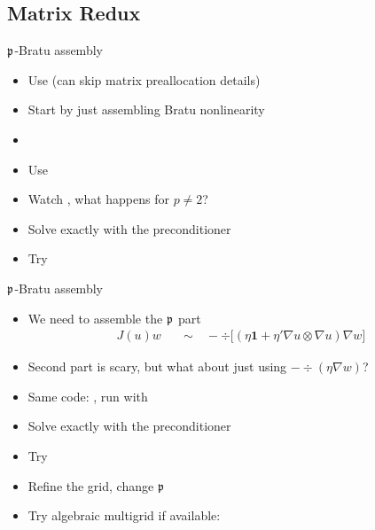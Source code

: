 \subsection{Matrix Redux}








\begin{frame}{${\mathfrak p}$-Bratu assembly}
  \begin{itemize}
  \item Use  (can skip matrix preallocation details)
  \item Start by just assembling Bratu nonlinearity
  \item {}
  \item Use 
  \item Watch , what happens for $p \ne 2$?
  \item Solve exactly with the preconditioner 
  \item Try 
  \end{itemize}
\end{frame}

\begin{frame}{${\mathfrak p}$-Bratu assembly}
  \begin{itemize}
  \item We need to assemble the ${\mathfrak p}$ part
    \begin{align*}
      J(u)w \quad &\sim\quad -\div \big[(\eta\bm 1 + \eta' \nabla u \otimes \nabla u) \nabla w\big]
    \end{align*}
  \item Second part is scary, but what about just using $-\div(\eta\nabla w)$?
  \item Same code: , run with 
  \item Solve exactly with the preconditioner 
  \item Try 
  \item Refine the grid, change ${\mathfrak p}$
  \item Try algebraic multigrid if available: 
  \end{itemize}
\end{frame}

